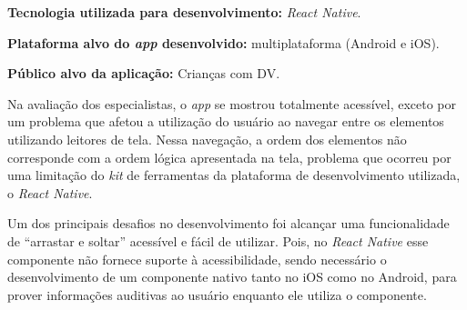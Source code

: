 \textbf{Tecnologia utilizada para desenvolvimento:} \emph{React Native}.

\textbf{Plataforma alvo do \emph{app} desenvolvido:} multiplataforma (Android e iOS).

\textbf{Público alvo da aplicação:} Crianças com DV\@.

Na avaliação dos especialistas, o \emph{app} se mostrou totalmente acessível, exceto por um problema que afetou a utilização do usuário ao navegar entre os elementos utilizando leitores de tela.
Nessa navegação, a ordem dos elementos não corresponde com a ordem lógica apresentada na tela, problema que ocorreu por uma limitação do \emph{kit} de ferramentas da plataforma de desenvolvimento utilizada, o \emph{React Native}.

Um dos principais desafios no desenvolvimento foi alcançar uma funcionalidade de ``arrastar e soltar'' acessível e fácil de utilizar.
Pois, no \emph{React Native} esse componente não fornece suporte à acessibilidade, sendo necessário o desenvolvimento de um componente nativo tanto no iOS como no Android, para prover informações auditivas ao usuário enquanto ele utiliza o componente.
